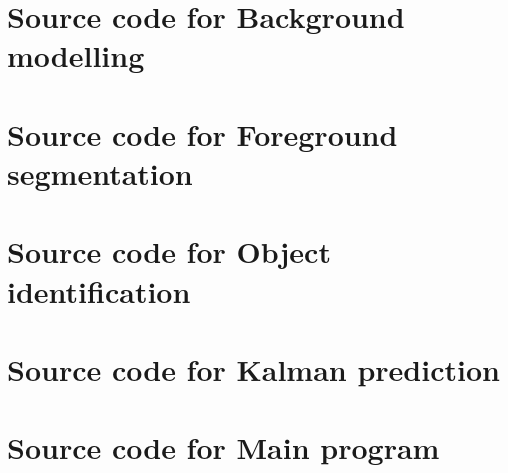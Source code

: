 \documentclass[10pt, a4paper, twoside]{article}
\numberwithin{equation}{section}
\numberwithin{figure}{section}
\begin{document}
\newpage
\section{Source code for Background modelling}
\label{sec:BGMod_code}


\newpage
\section{Source code for Foreground segmentation}
\label{sec:ForeGroundSeg_code}


\newpage
\section{Source code for Object identification}
\label{sec:ObjectID_code}


\newpage
\section{Source code for Kalman prediction}
\label{sec:Kalman_code}


\newpage
\section{Source code for Main program}
\label{sec:Main_code}



%
\end{document}
